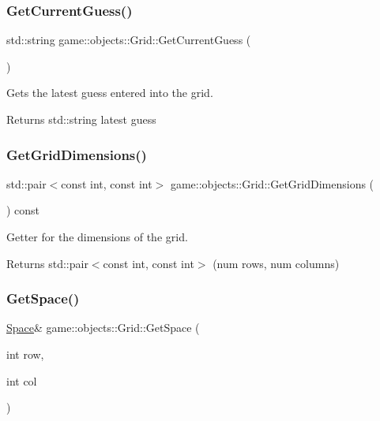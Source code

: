 \subsubsection{\texorpdfstring{Get\+Current\+Guess()}{GetCurrentGuess()}}
{\footnotesize\ttfamily std\+::string game\+::objects\+::\+Grid\+::\+Get\+Current\+Guess (\begin{DoxyParamCaption}{ }\end{DoxyParamCaption})}



Gets the latest guess entered into the grid. 

\begin{DoxyReturn}{Returns}
std\+::string latest guess 
\end{DoxyReturn}
\mbox{\label{classgame_1_1objects_1_1Grid_a16bf69070bed5732b1a42a97b83ea2cb}} 
\subsubsection{\texorpdfstring{Get\+Grid\+Dimensions()}{GetGridDimensions()}}
{\footnotesize\ttfamily std\+::pair$<$const int, const int$>$ game\+::objects\+::\+Grid\+::\+Get\+Grid\+Dimensions (\begin{DoxyParamCaption}{ }\end{DoxyParamCaption}) const}



Getter for the dimensions of the grid. 

\begin{DoxyReturn}{Returns}
std\+::pair$<$const int, const int$>$ (num rows, num columns) 
\end{DoxyReturn}
\mbox{\label{classgame_1_1objects_1_1Grid_a90aff1cebba7fa8de3d5dd452d59364c}} 
\subsubsection{\texorpdfstring{Get\+Space()}{GetSpace()}}
{\footnotesize\ttfamily \hyperlink{classgame_1_1objects_1_1Space}{Space}\& game\+::objects\+::\+Grid\+::\+Get\+Space (\begin{DoxyParamCaption}\item[{int}]{row,  }\item[{int}]{col }\end{DoxyParamCaption})}



